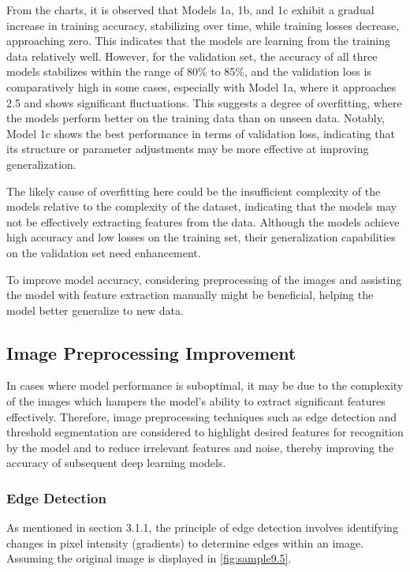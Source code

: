 From the charts, it is observed that Models 1a, 1b, and 1c exhibit a gradual increase in training accuracy, stabilizing over time, while training losses decrease, approaching zero. This indicates that the models are learning from the training data relatively well. However, for the validation set, the accuracy of all three models stabilizes within the range of 80\% to 85\%, and the validation loss is comparatively high in some cases, especially with Model 1a, where it approaches 2.5 and shows significant fluctuations. This suggests a degree of overfitting, where the models perform better on the training data than on unseen data. Notably, Model 1c shows the best performance in terms of validation loss, indicating that its structure or parameter adjustments may be more effective at improving generalization.

The likely cause of overfitting here could be the insufficient complexity of the models relative to the complexity of the dataset, indicating that the models may not be effectively extracting features from the data. Although the models achieve high accuracy and low losses on the training set, their generalization capabilities on the validation set need enhancement.

To improve model accuracy, considering preprocessing of the images and assisting the model with feature extraction manually might be beneficial, helping the model better generalize to new data.

\FloatBarrier


\subsection{Image Preprocessing Improvement}

In cases where model performance is suboptimal, it may be due to the complexity of the images which hampers the model's ability to extract significant features effectively. Therefore, image preprocessing techniques such as edge detection and threshold segmentation are considered to highlight desired features for recognition by the model and to reduce irrelevant features and noise, thereby improving the accuracy of subsequent deep learning models.


\subsubsection{Edge Detection}

As mentioned in section 3.1.1, the principle of edge detection involves identifying changes in pixel intensity (gradients) to determine edges within an image. Assuming the original image is displayed in \autoref{fig:sample9.5}.

